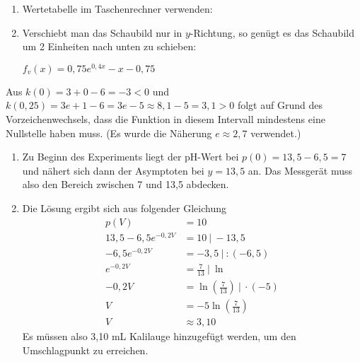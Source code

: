 \begin{Answer}[ref=eFktVA_8]
    \begin{enumerate}[label=\alph*)]
        \item Wertetabelle im Taschenrechner verwenden:


        \medskip

        \item Verschiebt man das Schaubild nur in \(y\)-Richtung, so genügt es das Schaubild um 2 Einheiten nach unten zu schieben:

        \(f_v(x)=0,75e^{0,4x}-x-0,75\)
    \end{enumerate}
\end{Answer}
\begin{Answer}[ref=eFktVA_9]

    Aus \(k(0)=3+0-6=-3<0\) und \(k(0,25)=3e+1-6=3e-5\approx8,1-5=3,1>0\) folgt auf Grund des Vorzeichenwechsels, dass die Funktion in diesem Intervall mindestens eine Nullstelle haben muss. (Es wurde die Näherung \(e\approx 2,7\) verwendet.)
\end{Answer}
\begin{Answer}[ref=eFktVA_10]
\begin{enumerate}[label=\alph*)]
    \item Zu Beginn des Experiments liegt der pH-Wert bei \(p(0)=13,5-6,5=7\) und nähert sich dann der Asymptoten bei \(y=13,5\) an. Das Messgerät muss also den Bereich zwischen 7 und 13,5 abdecken.
    \item Die Lösung ergibt sich aus folgender Gleichung
    \begin{align*}
        p(V)&=10\\
        13,5-6,5e^{-0,2V}&=10\ \vert\ -13,5\\
        -6,5e^{-0,2V}&=-3,5\ \vert\ :(-6,5)\\
        e^{-0,2V}&=\frac{7}{13}\ \vert\ \ln\\
        -0,2V&=\ln\left(\frac{7}{13}\right)\ \vert\ \cdot(-5)\\
        V&=-5\ln\left(\frac{7}{13}\right)\\
        V&\approx 3,10
    \end{align*}
    Es müssen also 3,10 mL Kalilauge hinzugefügt werden, um den Umschlagpunkt zu erreichen.
\end{enumerate}
\end{Answer}
